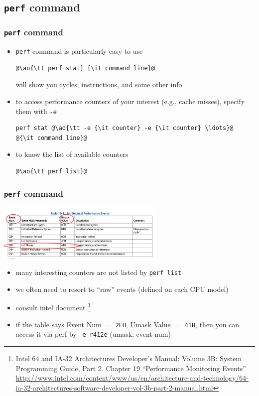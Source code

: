 \documentclass[12pt,dvipdfmx]{beamer}
\newcommand{\ao}[1]{{\color{blue}#1}}
\begin{document}
\subsection{{\tt perf} command}
\begin{frame}[fragile]
\frametitle{{\tt perf} command}
\begin{itemize}
\item {\tt perf} command is particularly easy to use
\begin{lstlisting}
@\ao{\tt perf stat} {\it command line}@
\end{lstlisting}
will show you cycles, instructions, and some other info

\item to access performance counters of your interest (e.g., cache misses),
  specify them with \ao{\tt -e}
\begin{lstlisting}
perf stat @\ao{\tt -e {\it counter} -e {\it counter} \ldots}@  @{\it command line}@

\end{lstlisting}
\item to know the list of available counters
\begin{lstlisting}
@\ao{\tt perf list}@
\end{lstlisting}
\end{itemize}
\end{frame}


\begin{frame}[fragile]
\frametitle{{\tt perf} command}

\begin{center}
\includegraphics[width=0.6\textwidth]{out/pdf/svg/counters_table.pdf}
\end{center}
\begin{itemize}
\item many interesting counters are not listed by {\tt perf list}
\item we often need to resort to ``raw'' events 
  (defined on each CPU model)
\item consult intel document
\footnote{{\scriptsize Intel 64 and IA-32 Architectures Developer's Manual: 
Volume 3B: System Programming Guide, Part 2. Chapter 19 ``Performance Monitoring Events'' 
\url{http://www.intel.com/content/www/us/en/architecture-and-technology/64-ia-32-architectures-software-developer-vol-3b-part-2-manual.html}}}
\item if the table says Event Num $=$ {\tt 2EH}, Umask Value $=$ {\tt 41H}, then you can access it via perf by {\tt -e r412e} (umask; event num)
\end{itemize}
\end{frame}
\end{document}
